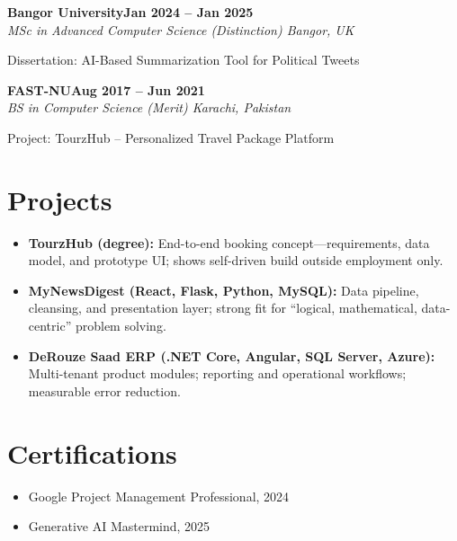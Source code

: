 \documentclass[letterpaper,10pt]{article}
\newcommand{\headingBf}[2]{
  \hspace{10pt}\textbf{#1}\hfill\textbf{#2}\\
}
\newcommand{\headingIt}[2]{
  \hspace{10pt}\textit{#1}\hfill\textit{#2}\\
}
\newenvironment{resume_list}{
  \vspace{-7pt}
  \begin{itemize}[itemsep=-2px, parsep=1pt, leftmargin=30pt]
}{
  \end{itemize}
}
\begin{document}
\headingBf{Bangor University}{Jan 2024 -- Jan 2025}
\headingIt{MSc in Advanced Computer Science (Distinction) \hfill Bangor, UK}{}
\begin{resume_list}
    \item Dissertation: AI-Based Summarization Tool for Political Tweets
\end{resume_list}

\headingBf{FAST-NU}{Aug 2017 -- Jun 2021}
\headingIt{BS in Computer Science (Merit) \hfill Karachi, Pakistan}{}
\begin{resume_list}
    \item Project: TourzHub -- Personalized Travel Package Platform
\end{resume_list}


\section{Projects}

\begin{itemize}
    \setlength\itemsep{3pt}
    \item \textbf{TourzHub (degree):} End-to-end booking concept---requirements, data model, and prototype UI; shows self-driven build outside employment only.
    \item \textbf{MyNewsDigest (React, Flask, Python, MySQL):} Data pipeline, cleansing, and presentation layer; strong fit for ``logical, mathematical, data-centric'' problem solving.
    \item \textbf{DeRouze Saad ERP (.NET Core, Angular, SQL Server, Azure):} Multi-tenant product modules; reporting and operational workflows; measurable error reduction.
\end{itemize}


\section{Certifications}

\begin{itemize}
    \item Google Project Management Professional, 2024
    \item Generative AI Mastermind, 2025
\end{itemize}

\vspace*{\fill}
\end{document}
